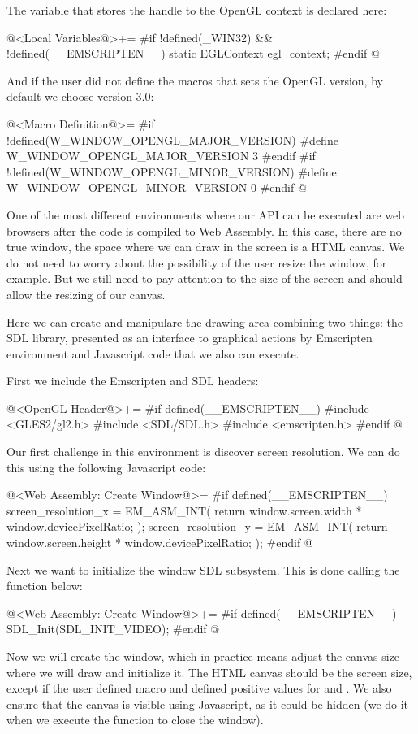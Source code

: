 The variable that stores the handle to the OpenGL context is declared
here:

\iniciocodigo
@<Local Variables@>+=
#if !defined(_WIN32) && !defined(__EMSCRIPTEN__)
static EGLContext egl_context;
#endif
@
\fimcodigo

And if the user did not define the macros that sets the OpenGL
version, by default we choose version 3.0:

\iniciocodigo
@<Macro Definition@>=
#if !defined(W_WINDOW_OPENGL_MAJOR_VERSION)
#define W_WINDOW_OPENGL_MAJOR_VERSION 3
#endif
#if !defined(W_WINDOW_OPENGL_MINOR_VERSION)
#define W_WINDOW_OPENGL_MINOR_VERSION 0
#endif
@
\fimcodigo



One of the most different environments where our API can be executed
are web browsers after the code is compiled to Web Assembly. In this
case, there are no true window, the space where we can draw in the
screen is a HTML canvas. We do not need to worry about the possibility
of the user resize the window, for example. But we still need to pay
attention to the size of the screen and should allow the resizing of
our canvas.

Here we can create and manipulare the drawing area combining two
things: the SDL library, presented as an interface to graphical
actions by Emscripten environment and Javascript code that we also can
execute.

First we include the Emscripten and SDL headers:

\iniciocodigo
@<OpenGL Header@>+=
#if defined(__EMSCRIPTEN__)
#include <GLES2/gl2.h>
#include <SDL/SDL.h>
#include <emscripten.h>
#endif
@
\fimcodigo


Our first challenge in this environment is discover screen
resolution. We can do this using the following Javascript code:

\iniciocodigo
@<Web Assembly: Create Window@>=
#if defined(__EMSCRIPTEN__)
screen_resolution_x = EM_ASM_INT({
  return window.screen.width * window.devicePixelRatio;
});
screen_resolution_y = EM_ASM_INT({
  return window.screen.height * window.devicePixelRatio;
});
#endif
@
\fimcodigo

Next we want to initialize the window SDL subsystem. This is done
calling the function below:

\iniciocodigo
@<Web Assembly: Create Window@>+=
#if defined(__EMSCRIPTEN__)
SDL_Init(SDL_INIT_VIDEO);
#endif
@
\fimcodigo

Now we will create the window, which in practice means adjust the
canvas size where we will draw and initialize it. The HTML canvas
should be the screen size, except if the user defined
macro  and defined positive
values for 
and . We also ensure that the
canvas is visible using Javascript, as it could be hidden (we do it
when we execute the function to close the window).

